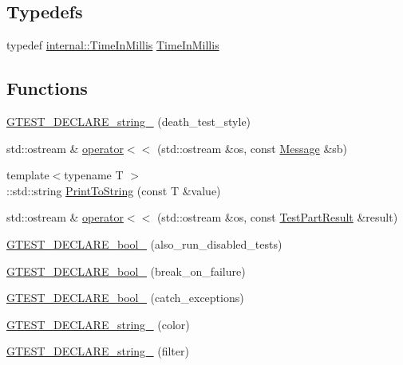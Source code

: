 \subsection*{Typedefs}
\begin{DoxyCompactItemize}
\item 
typedef \hyperlink{namespacetesting_1_1internal_a66a845df404b38fe85c5e14a069f255a}{internal\+::\+Time\+In\+Millis} \hyperlink{namespacetesting_a992de1d091ce660f451d1e8b3ce30fd6}{Time\+In\+Millis}
\end{DoxyCompactItemize}
\subsection*{Functions}
\begin{DoxyCompactItemize}
\item 
\hyperlink{namespacetesting_a37b7e87f0a5f502c6918f37d1768c1f3}{G\+T\+E\+S\+T\+\_\+\+D\+E\+C\+L\+A\+R\+E\+\_\+string\+\_\+} (death\+\_\+test\+\_\+style)
\item 
std\+::ostream \& \hyperlink{namespacetesting_a7b802e532fd68749765cb7dc156130db}{operator$<$$<$} (std\+::ostream \&os, const \hyperlink{classtesting_1_1_message}{Message} \&sb)
\item 
{\footnotesize template$<$typename T $>$ }\\\+::std\+::string \hyperlink{namespacetesting_aa5717bb1144edd1d262d310ba70c82ed}{Print\+To\+String} (const T \&value)
\item 
std\+::ostream \& \hyperlink{namespacetesting_a266e39b7c4691fedb856047673a412d8}{operator$<$$<$} (std\+::ostream \&os, const \hyperlink{classtesting_1_1_test_part_result}{Test\+Part\+Result} \&result)
\item 
\hyperlink{namespacetesting_a4c08ba9fcb0581c61e25968e520efa48}{G\+T\+E\+S\+T\+\_\+\+D\+E\+C\+L\+A\+R\+E\+\_\+bool\+\_\+} (also\+\_\+run\+\_\+disabled\+\_\+tests)
\item 
\hyperlink{namespacetesting_a5868c3980b2f69f511fc8c3de7cdfc17}{G\+T\+E\+S\+T\+\_\+\+D\+E\+C\+L\+A\+R\+E\+\_\+bool\+\_\+} (break\+\_\+on\+\_\+failure)
\item 
\hyperlink{namespacetesting_ab6f1777f7b740f31e41f7da017447b58}{G\+T\+E\+S\+T\+\_\+\+D\+E\+C\+L\+A\+R\+E\+\_\+bool\+\_\+} (catch\+\_\+exceptions)
\item 
\hyperlink{namespacetesting_a0f658c915a1e60996a2ab00a06612723}{G\+T\+E\+S\+T\+\_\+\+D\+E\+C\+L\+A\+R\+E\+\_\+string\+\_\+} (color)
\item 
\hyperlink{namespacetesting_a20d69860ce843142c7f740262e6b0c9a}{G\+T\+E\+S\+T\+\_\+\+D\+E\+C\+L\+A\+R\+E\+\_\+string\+\_\+} (filter)

\end{DoxyCompactItemize}
